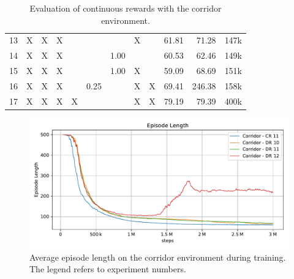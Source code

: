 \begin{table}[htp]
\begin{center}
\begin{tabular}{rccccccccrrr}
            13 & X & X & X &  &  &  & X &  & 61.81 & 71.28 & 147k \\
            14 & X & X & X &  &  & 1.00 &  &  & 60.53 & 62.46 & 149k \\
            15 & X & X & X &  &  & 1.00 & X &  & 59.09 & 68.69 & 151k \\
            16 & X & X & X &  & 0.25 &  & X & X & 69.41 & 246.38 & 158k \\
            17 & X & X & X & X &  &  & X & X & 79.19 & 79.39 & 400k \\
            \bottomrule
        \end{tabular}
    \end{center}
    \caption[Evaluation of Continuous Reward with the Corridor Environment]{Evaluation of continuous rewards with the corridor environment.} \label{tab:Maze0318/Reward/Continuous}
\end{table}


\begin{figure}[htp]
    
    \begin{center}
        \includegraphics[clip, width=0.75\columnwidth]{figures/evaluation/rewards/continuous_vs_discrete.pdf}
    \end{center}
    
    \caption[Training Curves with Curiosity Reward]{Average episode length on the corridor environment during training. The legend refers to experiment numbers.}
    \label{fig:ContinuousVsDiscrete}
\end{figure}


